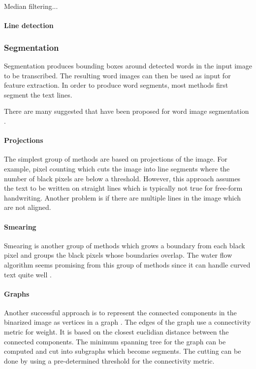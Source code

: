 Median filtering...

\paragraph{Line detection}


\subsubsection{Segmentation}

Segmentation produces bounding boxes around detected words in the input image to be transcribed. The resulting word images can then be used as input for feature extraction. In order to produce word segments, most methods first segment the text lines.

There are many suggested that have been proposed for word image segmentation \cite{HWR_survey, Waterflow2011, Waterflow2015}.

\paragraph{Projections}

The simplest group of methods are based on projections of the image. For example, pixel counting which cuts the image into line segments where the number of black pixels are below a threshold. However, this approach assumes the text to be written on straight lines which is typically not true for free-form handwriting. Another problem is if there are multiple lines in the image which are not aligned.

\paragraph{Smearing}

Smearing is another group of methods which grows a boundary from each black pixel and groups the black pixels whose boundaries overlap. The water flow algorithm seems promising from this group of methods since it can handle curved text quite well \cite{Waterflow2011, Waterflow2015}.

\paragraph{Graphs}

Another successful approach is to represent the connected components in the binarized image as vertices in a graph \cite{GraphSegmentation}. The edges of the graph use a connectivity metric for weight. It is based on the closest euclidian distance between the connected components.
The minimum spanning tree for the graph can be computed and cut into subgraphs which become segments. The cutting can be done by using a pre-determined threshold for the connectivity metric.

